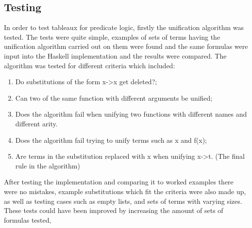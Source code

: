 \documentclass{article}%
\begin{document}
\subsection{Testing}
In order to test tableaux for predicate logic, firstly the unification algorithm was tested. The tests were quite simple, examples of sets of terms having the unification algorithm carried out on them were found \cite{struth_2019} and the same formulas were input into the Haskell implementation and the results were compared. The algorithm was tested for different criteria which included:
\begin{enumerate}
\item Do substitutions of the form x->x get deleted?;
\item Can two of the same function with different arguments be unified;
\item Does the algorithm fail when unifying two functions with different names and different arity. 
\item Does the algorithm fail trying to unify terms such as x and f(x);
\item Are terms in the substitution replaced with x when unifying x->t. (The final rule in the algorithm) 
\end{enumerate}
After testing the implementation and comparing it to worked examples \cite{struth_2019} there were no mistakes, example substitutions which fit the criteria were also made up, as well as testing cases such as empty lists, and sets of terms with varying sizes. These tests could have been improved by increasing the amount of sets of formulas tested, 
\end{document}
